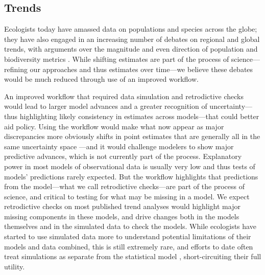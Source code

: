 \documentclass[11pt]{article}
\begin{document}
\subsection{Trends}

Ecologists today have amassed data on populations and species across the globe; they have also engaged in an increasing number of debates on regional and global trends, with arguments over the magnitude and even direction of population and biodiversity metrics \citep{Dornelas2014,Leung2020,terry2022no,muller2024weather}. While shifting estimates are part of the process of science---refining our approaches and thus estimates over time---we believe these debates would be much reduced through use of an improved workflow. %

An improved workflow that required data simulation and retrodictive checks would lead to larger model advances and a greater recognition of uncertainty---thus highlighting likely consistency in estimates across models---that could better aid policy.  Using the workflow would make what now appear as major discrepancies more obviously shifts in point estimates that are generally all in the same uncertainty space \citep{Johnson2024}---and it would challenge modelers to show major predictive advances, which is not currently part of the process. Explanatory power in most models of observational data is usually very low \citep{low2014rising,moller2002much} and thus tests of models' predictions rarely expected. But the workflow highlights that predictions from the model---what we call retrodictive checks---are part of the process of science, and critical to testing for what may be missing in a model. We expect retrodictive checks on most published trend analyses would highlight major missing components in these models, and drive changes both in the models themselves and in the simulated data to check the models. While ecologists have started to use simulated data more to understand potential limitations of their models and data combined, this is still extremely rare, and efforts to date often treat simulations as separate from the statistical model \citep{Buschke2021,dove2023quantifying}, short-circuiting their full utility.
\end{document}
